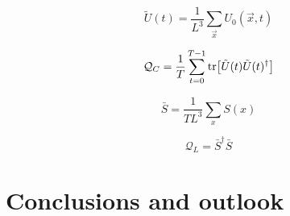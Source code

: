 \begin{equation}
\tilde U(t) = \frac{1}{L^3} \sum_{\vec x} U_{0}(\vec x,t)
\end{equation}

\begin{equation}
\mathcal Q_C = \frac{1}{T} \sum_{t=0}^{T-1} \tr [\tilde U(t) \tilde U(t)^{\dagger}]
\end{equation}

\begin{equation}
\bar S = \frac{1}{TL^3} \sum_{x} S(x)
\end{equation}

\begin{equation}
\mathcal Q_L = \bar S^{\dagger} \bar S
\end{equation}



\section{Conclusions and outlook}



